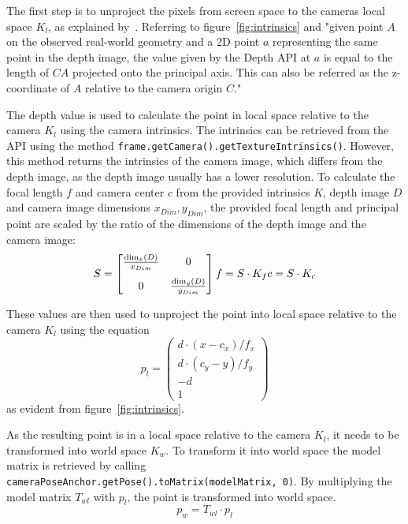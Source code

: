 The first step is to unproject the pixels from screen space to the cameras local space $K_l$, as explained by~\cite{google_llc_codelab_raw_depth, google_llc_arcore_doc}.
Referring to figure~\ref{fig:intrinsics} and
"given point $A$ on the observed real-world geometry and a 2D point $a$ representing the same point in the depth image,
the value given by the Depth API at $a$ is equal to the length of $CA$ projected onto the principal axis.
This can also be referred as the z-coordinate of $A$ relative to the camera origin $C$."~\parencite{google_llc_arcore_doc}

The depth value is used to calculate the point in local space relative to the camera $K_l$ using the camera intrinsics.
The intrinsics can be retrieved from the API using the method \texttt{frame.getCamera().getTextureIntrinsics()}.
However, this method returns the intrinsics of the camera image, which differs from the depth image, as the depth image usually has a lower resolution.
To calculate the focal length $f$ and camera center $c$ from the provided intrinsics $K$, depth image $D$ and camera image dimensions $x_{Dim}, y_{Dim}$,
the provided focal length and principal point are scaled by the ratio of the dimensions of the depth image and the camera image:
\begin{equation}
    S = \begin{bmatrix}
            \frac{\dim_x(D)}{x_{Dim}} & 0\\[8pt]
            0                         & \frac{\dim_y(D)}{y_{Dim}}
    \end{bmatrix}\\
    f = S \cdot K_f \\
    c = S \cdot K_c
\end{equation}

These values are then used to unproject the point into local space relative to the camera $K_l$ using the equation
\begin{equation}
    p_l = \begin{pmatrix}
              d \cdot (x - c_x) / f_x \\
              d \cdot (c_y - y) / f_y \\
              -d                      \\
              1
    \end{pmatrix}
\end{equation}
as evident from figure~\ref{fig:intrinsics}.

As the resulting point is in a local space relative to the camera $K_l$, it needs to be transformed into world space $K_w$.
To transform it into world space the model matrix is retrieved by calling
\texttt{cameraPoseAnchor.getPose().toMatrix(modelMatrix, 0)}.
By multiplying the model matrix $T_{wl}$ with $p_l$, the point is transformed into world space.
\begin{equation}
    p_w = T_{wl} \cdot p_l
\end{equation}

